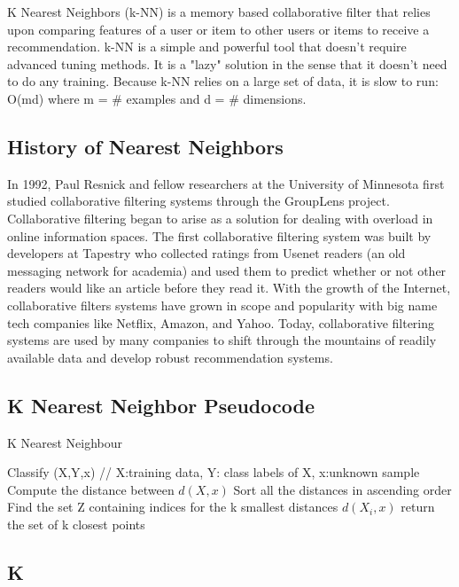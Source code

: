 \documentclass{report}
\begin{document}
K Nearest Neighbors (k-NN) is a memory based collaborative filter that relies upon comparing features of a user or item to other users or items to receive a recommendation. 
k-NN is a simple and powerful tool that doesn't require advanced tuning methods. 
It is a "lazy" solution in the sense that it doesn't need to do any training\cite{1}.
Because k-NN relies on a large set of data, it is slow to run: O(md) where m = \# examples and d = \# dimensions.

\subsection*{History of Nearest Neighbors}

In 1992, Paul Resnick and fellow researchers at the University of Minnesota first studied collaborative filtering systems through the GroupLens project\cite{2}.  Collaborative filtering began to arise as a solution for dealing with overload in online information spaces. The first collaborative filtering system was built by developers at Tapestry who collected ratings from Usenet readers (an old messaging network for academia) and
used them to predict whether or not other readers would like an article before they read it.\cite{3} With the growth of the Internet, collaborative filters systems have grown in scope and popularity with big name tech companies like Netflix, Amazon, and Yahoo. Today, collaborative filtering systems are used by many companies to shift through the mountains of readily available data and develop robust recommendation systems.

\subsection*{K Nearest Neighbor Pseudocode }
\begin{algorithm}
  \caption{K Nearest Neighbour}
  \begin{algorithmic}
  	\State Classify (X,Y,x) // X:training data, Y: class labels of X, x:unknown sample
	\State Compute the distance between $d(X, x)$
	\State Sort all the distances in ascending order
	\EndFor
	\State Find the set Z containing indices for the k smallest distances $d(X_{i},x)$
	\State return the set of k closest points 
  \end{algorithmic}
\end{algorithm}


\subsection*{K}
\end{document}
